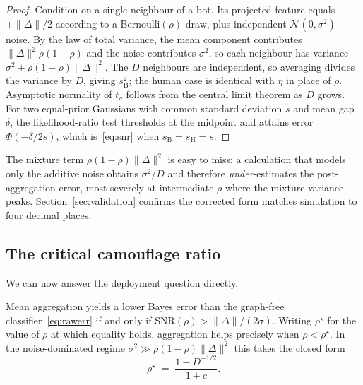\documentclass[../elsevier.tex]{subfiles}
\begin{document}
\begin{proof}
Condition on a single neighbour of a bot. Its projected feature equals
$\pm\|\Delta\|/2$ according to a Bernoulli$(\rho)$ draw, plus independent
$\mathcal{N}(0,\sigma^2)$ noise. By the law of total variance, the mean component
contributes $\|\Delta\|^2\rho(1-\rho)$ and the noise contributes $\sigma^2$, so each
neighbour has variance $\sigma^2 + \rho(1-\rho)\|\Delta\|^2$. The $D$ neighbours are
independent, so averaging divides the variance by $D$, giving $s_{\mathrm{B}}^2$;
the human case is identical with $\eta$ in place of $\rho$. Asymptotic normality of
$t_v$ follows from the central limit theorem as $D$ grows. For two equal-prior
Gaussians with common standard deviation $s$ and mean gap $\delta$, the
likelihood-ratio test thresholds at the midpoint and attains error
$\Phi(-\delta/2s)$, which is~\eqref{eq:snr} when $s_{\mathrm{B}} = s_{\mathrm{H}} = s$.
\end{proof}

\begin{remark}
The mixture term $\rho(1-\rho)\|\Delta\|^2$ is easy to miss: a calculation that
models only the additive noise obtains $\sigma^2/D$ and therefore
\emph{under}-estimates the post-aggregation error, most severely at intermediate
$\rho$ where the mixture variance peaks. Section~\ref{sec:validation} confirms
the corrected form matches simulation to four decimal places.
\end{remark}

\subsection{The critical camouflage ratio}

We can now answer the deployment question directly.

\begin{corollary}
\label{cor:critical}
Mean aggregation yields a lower Bayes error than the graph-free
classifier~\eqref{eq:rawerr} if and only if $\mathrm{SNR}(\rho) > \|\Delta\|/(2\sigma)$.
Writing $\rho^\star$ for the value of $\rho$ at which equality holds, aggregation
helps precisely when $\rho < \rho^\star$. In the noise-dominated regime
$\sigma^2 \gg \rho(1-\rho)\|\Delta\|^2$ this takes the closed form
\begin{equation}
    \rho^\star \;=\; \frac{1 - D^{-1/2}}{1+c}.
    \label{eq:critical}
\end{equation}
\end{corollary}
\end{document}
